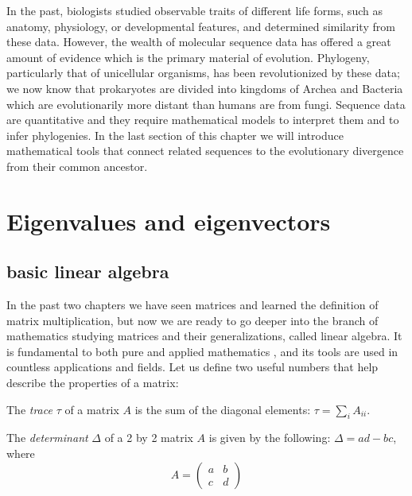 \documentclass[
  letterpaper,
  DIV=11,
  numbers=noendperiod]{scrreprt}
\begin{document}
In the past, biologists studied observable traits of different life
forms, such as anatomy, physiology, or developmental features, and
determined similarity from these data. However, the wealth of molecular
sequence data has offered a great amount of evidence which is the
primary material of evolution. Phylogeny, particularly that of
unicellular organisms, has been revolutionized by these data; we now
know that prokaryotes are divided into kingdoms of Archea and Bacteria
which are evolutionarily more distant than humans are from fungi.
Sequence data are quantitative and they require mathematical models to
interpret them and to infer phylogenies. In the last section of this
chapter we will introduce mathematical tools that connect related
sequences to the evolutionary divergence from their common ancestor.

\hypertarget{eigenvalues-and-eigenvectors}{%
\section{Eigenvalues and
eigenvectors}\label{eigenvalues-and-eigenvectors}}

\hypertarget{basic-linear-algebra}{%
\subsection{basic linear algebra}\label{basic-linear-algebra}}

In the past two chapters we have seen matrices and learned the
definition of matrix multiplication, but now we are ready to go deeper
into the branch of mathematics studying matrices and their
generalizations, called linear algebra. It is fundamental to both pure
and applied mathematics \cite{strang_linear_2005}, and its tools are
used in countless applications and fields. Let us define two useful
numbers that help describe the properties of a matrix:

\begin{tcolorbox}[enhanced jigsaw, arc=.35mm, colframe=quarto-callout-note-color-frame, left=2mm, opacitybacktitle=0.6, breakable, title=\textcolor{quarto-callout-note-color}{\faInfo}\hspace{0.5em}{Definition}, toprule=.15mm, coltitle=black, bottomtitle=1mm, toptitle=1mm, colback=white, leftrule=.75mm, colbacktitle=quarto-callout-note-color!10!white, titlerule=0mm, opacityback=0, rightrule=.15mm, bottomrule=.15mm]

The \emph{trace} \(\tau\) of a matrix \(A\) is the sum of the diagonal
elements: \(\tau = \sum_i A_{ii}\).

The \emph{determinant} \(\Delta\) of a 2 by 2 matrix \(A\) is given by
the following: \(\Delta = ad - bc\), where
\[ A = \left(\begin{array}{cc}a & b \\c & d\end{array}\right) \]

\end{tcolorbox}
\end{document}
